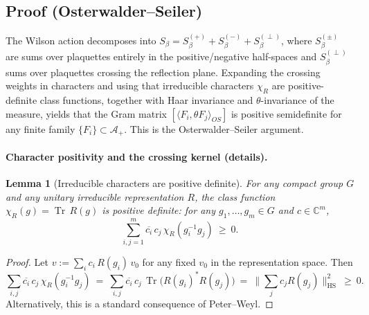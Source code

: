 \documentclass[11pt]{amsart}
\theoremstyle{plain}
\newtheorem{lemma}[theorem]{Lemma}
\theoremstyle{definition}
\theoremstyle{remark}
\begin{document}
\subsection*{Proof (Osterwalder--Seiler)}
The Wilson action decomposes into $S_\beta=S_\beta^{(+)}+S_\beta^{(-)}+S_\beta^{(\perp)}$, where $S_\beta^{(\pm)}$ are sums over plaquettes entirely in the positive/negative half-spaces and $S_\beta^{(\perp)}$ sums over plaquettes crossing the reflection plane. Expanding the crossing weights in characters and using that irreducible characters $\chi_R$ are positive-definite class functions, together with Haar invariance and $\theta$-invariance of the measure, yields that the Gram matrix $[\langle F_i,\theta F_j\rangle_{OS}]$ is positive semidefinite for any finite family $\{F_i\}\subset \mathcal A_+$. This is the Osterwalder--Seiler argument.

\paragraph{Character positivity and the crossing kernel (details).}
\begin{lemma}[Irreducible characters are positive definite]\label{lem:char-pd}
For any compact group $G$ and any unitary irreducible representation $R$, the class function $\chi_R(g)=\operatorname{Tr}\,R(g)$ is positive definite: for any $g_1,\dots,g_m\in G$ and $c\in\mathbb C^m$,
\[
  \sum_{i,j=1}^m \overline{c_i}\,c_j\,\chi_R(g_i^{-1} g_j)\ \ge\ 0.
\]
\end{lemma}
\begin{proof}
Let $v:=\sum_i c_i\,R(g_i)\,v_0$ for any fixed $v_0$ in the representation space. Then
\[
  \sum_{i,j}\overline{c_i}\,c_j\,\chi_R(g_i^{-1} g_j)\ =\ \sum_{i,j}\overline{c_i}\,c_j\,\operatorname{Tr}\big(R(g_i)^{*}R(g_j)\big)\ =\ \|\sum_j c_j R(g_j)\|_{\mathrm{HS}}^2\ \ge\ 0.
\]
Alternatively, this is a standard consequence of Peter–Weyl.
\end{proof}
\end{document}
